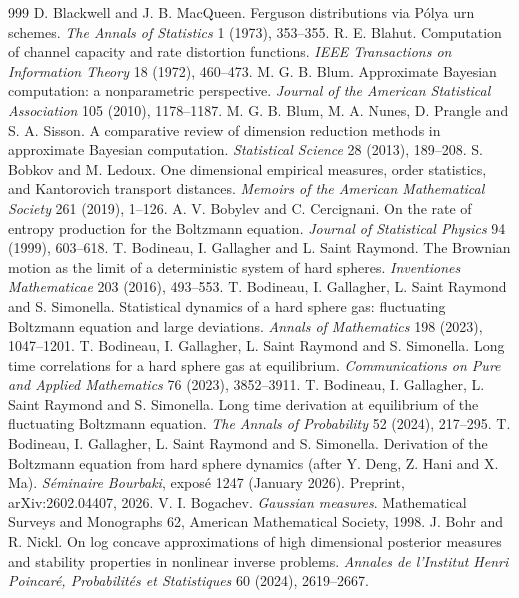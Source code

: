 \begin{thebibliography}{999}
 D. Blackwell and J. B. MacQueen. Ferguson distributions via P\'olya urn schemes. \emph{The Annals of Statistics} 1 (1973), 353--355.
 R. E. Blahut. Computation of channel capacity and rate distortion functions. \emph{IEEE Transactions on Information Theory} 18 (1972), 460--473.
 M. G. B. Blum. Approximate Bayesian computation: a nonparametric perspective. \emph{Journal of the American Statistical Association} 105 (2010), 1178--1187.
 M. G. B. Blum, M. A. Nunes, D. Prangle and S. A. Sisson. A comparative review of dimension reduction methods in approximate Bayesian computation. \emph{Statistical Science} 28 (2013), 189--208.
 S. Bobkov and M. Ledoux. One dimensional empirical measures, order statistics, and Kantorovich transport distances. \emph{Memoirs of the American Mathematical Society} 261 (2019), 1--126.
 A. V. Bobylev and C. Cercignani. On the rate of entropy production for the Boltzmann equation. \emph{Journal of Statistical Physics} 94 (1999), 603--618.
 T. Bodineau, I. Gallagher and L. Saint Raymond. The Brownian motion as the limit of a deterministic system of hard spheres. \emph{Inventiones Mathematicae} 203 (2016), 493--553.
 T. Bodineau, I. Gallagher, L. Saint Raymond and S. Simonella. Statistical dynamics of a hard sphere gas: fluctuating Boltzmann equation and large deviations. \emph{Annals of Mathematics} 198 (2023), 1047--1201.
 T. Bodineau, I. Gallagher, L. Saint Raymond and S. Simonella. Long time correlations for a hard sphere gas at equilibrium. \emph{Communications on Pure and Applied Mathematics} 76 (2023), 3852--3911.
 T. Bodineau, I. Gallagher, L. Saint Raymond and S. Simonella. Long time derivation at equilibrium of the fluctuating Boltzmann equation. \emph{The Annals of Probability} 52 (2024), 217--295.
 T. Bodineau, I. Gallagher, L. Saint Raymond and S. Simonella. Derivation of the Boltzmann equation from hard sphere dynamics (after Y. Deng, Z. Hani and X. Ma). \emph{S\'eminaire Bourbaki}, expos\'e 1247 (January 2026). Preprint, arXiv:2602.04407, 2026.
 V. I. Bogachev. \emph{Gaussian measures}. Mathematical Surveys and Monographs 62, American Mathematical Society, 1998.
 J. Bohr and R. Nickl. On log concave approximations of high dimensional posterior measures and stability properties in nonlinear inverse problems. \emph{Annales de l'Institut Henri Poincar\'e, Probabilit\'es et Statistiques} 60 (2024), 2619--2667.

\end{thebibliography}
